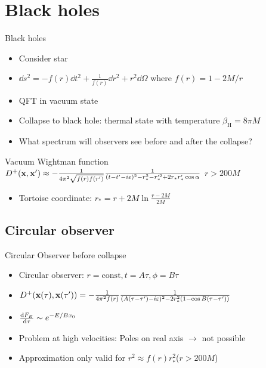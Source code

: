 \documentclass{beamer}
\newcommand{\ind}[1]{_\mathrm{#1}}
\begin{document}
\section{Black holes}
\begin{frame}{Black holes}
\begin{itemize}
	\item Consider star
	\item \(\dd s^2 = -f(r)\dd{t^2} + \frac{1}{f(r)}\dd{r^2} + r^2 \dd{\Omega}\) where \(f(r) = 1 - 2M/r\)
	\item QFT in vacuum state
	\item Collapse to black hole: thermal state with temperature \(\beta\ind{H} = 8\pi M\)
	\item What spectrum will observers see before and after the collapse?
\end{itemize}
\begin{block}{Vacuum Wightman function}
	\(D^+(\vb{x}, \vb{x}') \approx -\frac{1}{4\pi^2 \sqrt{f(r)f(r')}} \frac{1}{(t-t'-i\varepsilon)^2 - r_*^2 - r_*'^2 + 2r_*r_*' \cos{\alpha}}\) \hspace{1cm} \(r > 200M\)
\end{block}
\begin{itemize}
	\item Tortoise coordinate: \(r_* = r + 2M \ln \frac{r-2M}{2M}\)
\end{itemize}
\end{frame}


\subsection{Circular observer}

\begin{frame}{Circular Observer before collapse}
\begin{itemize}
	\item Circular observer: \(r = \mathrm{const}, t = A\tau, \phi = B \tau\)
	\item \(D^+(\vb{x}(\tau), \vb{x}(\tau')) = -\frac{1}{4\pi^2f(r)} \frac{1}{(A(\tau-\tau')-i\varepsilon)^2 - 2r_*^2 (1 - \cos{B(\tau-\tau')})}\)
	\item \(\dv{F_E}{\tau} \sim e^{-E/B x_0}\)
	\item Problem at high velocities: Poles on real axis \(\to\) not possible
	\item Approximation only valid for \(r^2 \approx f(r)r_*^2\)\hspace{1cm}(\(r > 200 M\))
\end{itemize}
\end{frame}
\end{document}
